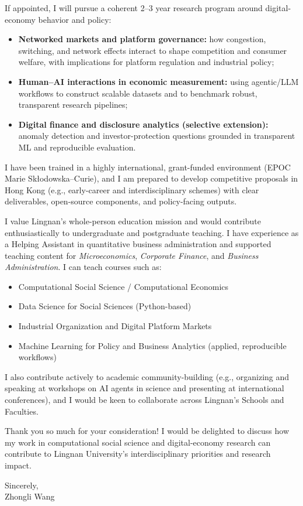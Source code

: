 \documentclass[11pt]{article}
\begin{document}
If appointed, I will pursue a coherent 2--3 year research program around digital-economy behavior and policy:
\begin{itemize}
    \item \textbf{Networked markets and platform governance:} how congestion, switching, and network effects interact to shape competition and consumer welfare, with implications for platform regulation and industrial policy;
    \item \textbf{Human--AI interactions in economic measurement:} using agentic/LLM workflows to construct scalable datasets and to benchmark robust, transparent research pipelines;
    \item \textbf{Digital finance and disclosure analytics (selective extension):} anomaly detection and investor-protection questions grounded in transparent ML and reproducible evaluation.
\end{itemize}
I have been trained in a highly international, grant-funded environment (EPOC Marie Sk\l odowska--Curie), and I am prepared to develop competitive proposals in Hong Kong (e.g., early-career and interdisciplinary schemes) with clear deliverables, open-source components, and policy-facing outputs.

I value Lingnan’s whole-person education mission and would contribute enthusiastically to undergraduate and postgraduate teaching. I have experience as a Helping Assistant in quantitative business administration and supported teaching content for \textit{Microeconomics}, \textit{Corporate Finance}, and \textit{Business Administration}. I can teach courses such as:
\begin{itemize}
    \item Computational Social Science / Computational Economics
    \item Data Science for Social Sciences (Python-based)
    \item Industrial Organization and Digital Platform Markets
    \item Machine Learning for Policy and Business Analytics (applied, reproducible workflows)
\end{itemize}
I also contribute actively to academic community-building (e.g., organizing and speaking at workshops on AI agents in science and presenting at international conferences), and I would be keen to collaborate across Lingnan’s Schools and Faculties.

Thank you so much for your consideration! I would be delighted to discuss how my work in computational social science and digital-economy research can contribute to Lingnan University’s interdisciplinary priorities and research impact.

\vspace{6mm}
\noindent Sincerely,\\[10mm]
\noindent Zhongli Wang
\end{document}
